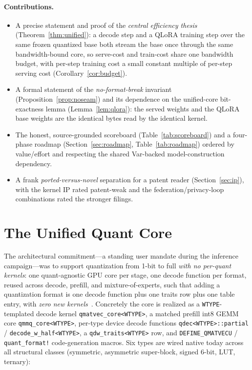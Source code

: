 \documentclass[11pt]{article}
\begin{document}
\paragraph{Contributions.}
\begin{itemize}
\item A precise statement and proof of the \emph{central efficiency thesis} (Theorem~\ref{thm:unified}): a decode step and a QLoRA training step over the same frozen quantized base both stream the base once through the same bandwidth-bound core, so serve-cost and train-cost share one bandwidth budget, with per-step training cost a small constant multiple of per-step serving cost (Corollary~\ref{cor:budget}).
\item A formal statement of the \emph{no-format-break} invariant (Proposition~\ref{prop:noseam}) and its dependence on the unified-core bit-exactness lemma (Lemma~\ref{lem:qlora}): the served weights and the QLoRA base weights are the identical bytes read by the identical kernel.
\item The honest, source-grounded scoreboard (Table~\ref{tab:scoreboard}) and a four-phase roadmap (Section~\ref{sec:roadmap}, Table~\ref{tab:roadmap}) ordered by value/effort and respecting the shared Var-backed model-construction dependency.
\item A frank \emph{ported-versus-novel} separation for a patent reader (Section~\ref{sec:ip}), with the kernel IP rated patent-weak and the federation/privacy-loop combinations rated the stronger filings.
\end{itemize}

\section{The Unified Quant Core}
\label{sec:core}

The architectural commitment---a standing user mandate during the inference campaign---was to support quantization from 1-bit to full \emph{with no per-quant kernels}: one quant-agnostic GPU core per stage, one decode function per format, reused across decode, prefill, and mixture-of-experts, such that adding a quantization format is one decode function plus one traits row plus one table entry, with \emph{zero new kernels}~\cite{hanzo-rocm}. Concretely the core is realized as a \texttt{WTYPE}-templated decode kernel \texttt{qmatvec\_core<WTYPE>}, a matched prefill int8 GEMM core \texttt{qmmq\_core<WTYPE>}, per-type device decode functions \texttt{qdec<WTYPE>::partial} / \texttt{decode\_w\_half<WTYPE>}, a \texttt{qdw\_traits<WTYPE>} row, and \texttt{DEFINE\_QMATVECU} / \texttt{quant\_format!} code-generation macros. Six types are wired native today across all structural classes (symmetric, asymmetric super-block, signed 6-bit, LUT, ternary):
\end{document}

